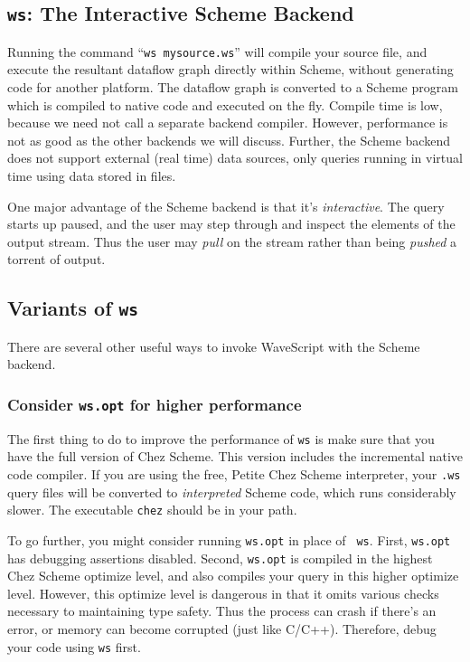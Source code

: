 \documentclass[twocolumn]{report}
\begin{document}
\subsection{{\tt \bf ws}: The Interactive Scheme Backend}

Running the command ``{\tt ws mysource.ws}'' will compile your source
file, and execute the resultant dataflow graph directly within Scheme,
without generating code for another platform.
%
The dataflow graph is converted to a Scheme program which is compiled
to native code and executed on the fly.  Compile time is low, because
we need not call a separate backend compiler.  However, performance is
not as good as the other backends we will discuss.  Further, the
Scheme backend does not support external (real time) data sources,
only queries running in virtual time using data stored in files.

One major advantage of the Scheme backend is that it's {\em
  interactive}.  The query starts up paused, and the user may step
through and inspect the elements of the output stream.  Thus the user
may {\em pull} on the stream rather than being {\em pushed} a torrent
of output.


\subsection*{Variants of {\tt \bf ws}}

There are several other useful ways to invoke WaveScript with the
Scheme backend.

\subsubsection*{Consider {\tt \bf ws.opt} for higher performance}

The first thing to do to improve the performance of {\tt ws} is make
sure that you have the full version of Chez Scheme.  This version
includes the incremental native code compiler.  If you are using the
free, Petite Chez Scheme interpreter, your {\tt .ws} query files will
be converted to {\em interpreted} Scheme code, which runs considerably
slower.  The executable {\tt chez} should be in your path.

To go further, you might consider running {\tt ws.opt} in place of {\tt
ws}.  First, {\tt ws.opt} has debugging assertions disabled. 
Second, {\tt ws.opt} is compiled in the highest Chez Scheme optimize
level, and also compiles your query in this higher optimize level.
However, this optimize level is dangerous in that it omits various
checks necessary to maintaining type safety.  Thus the process can
crash if there's an error, or memory can become corrupted (just like
C/C++).  Therefore, debug your code using {\tt ws} first.
\end{document}
